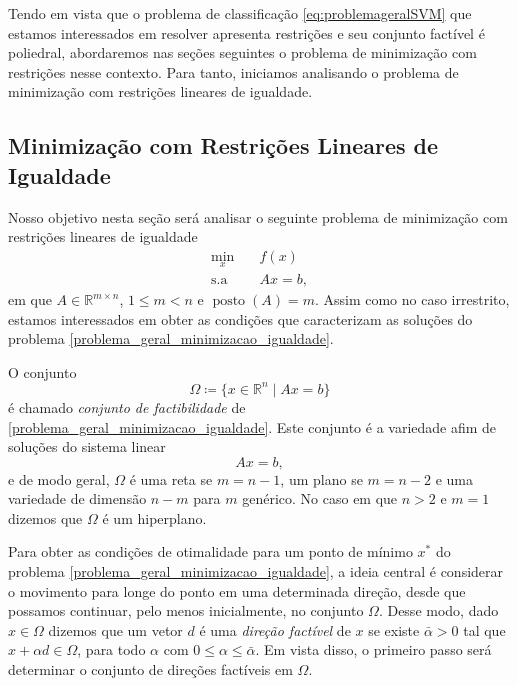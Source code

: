 \documentclass[12pt,a4paper]{scrartcl}
\DeclareMathOperator{\posto}{posto}
\def\RR{\mathds{R}}
\theoremstyle{definition}%
\begin{document}
Tendo em vista que o problema de classificação \eqref{eq:problemageralSVM} que estamos interessados em resolver apresenta restrições e seu conjunto factível é poliedral, abordaremos nas seções seguintes o problema de minimização com restrições nesse contexto. Para tanto, iniciamos analisando o problema de minimização com restrições lineares de igualdade.


\subsection{Minimização com Restrições Lineares de Igualdade} \label{section:restricoes_igualdade}

Nosso objetivo nesta seção será analisar o seguinte problema de minimização com restrições lineares de igualdade
\[ \label{problema_geral_minimizacao_igualdade}
\begin{aligned}
\min_{x} & \quad f(x) \\
\text{s.a} & \quad Ax=b,
\end{aligned}
\]
em que $A \in \RR^{m\times n}$, $1 \leq m <n$ e $\posto (A)=m$. Assim como no caso irrestrito, estamos interessados em obter as condições que caracterizam as soluções do problema \eqref{problema_geral_minimizacao_igualdade}.

O conjunto
\[
\Omega \coloneqq  \{ x \in \RR^{n} \mid Ax=b \}
\]
é chamado \emph{conjunto de factibilidade} de \eqref{problema_geral_minimizacao_igualdade}. Este conjunto é a variedade afim de soluções do sistema linear
\[ \label{eq:restricao_de_igualdade}
Ax=b,
\]
e de modo geral, $\Omega$ é uma reta se $m=n-1$, um plano se $m=n-2$ e uma variedade de dimensão $n-m$ para $m$ genérico. No caso em que $n>2$ e $m=1$ dizemos que $\Omega$ é um hiperplano. 

Para obter as condições de otimalidade para um ponto de mínimo $x^{*}$ do problema \eqref{problema_geral_minimizacao_igualdade}, a ideia central é considerar o movimento para longe do ponto em uma determinada direção, desde que possamos continuar, pelo menos inicialmente, no conjunto $\Omega$. Desse modo, dado $x \in \Omega$ dizemos que um vetor $d$ é uma \emph{direção factível} de $x$ se existe $\bar{\alpha} >0$ tal que $x + \alpha d \in \Omega$, para todo $\alpha$ com $0 \leq \alpha \leq \bar{\alpha}$. Em vista disso, o primeiro passo será determinar o conjunto de direções factíveis em $\Omega$. 
\end{document}
